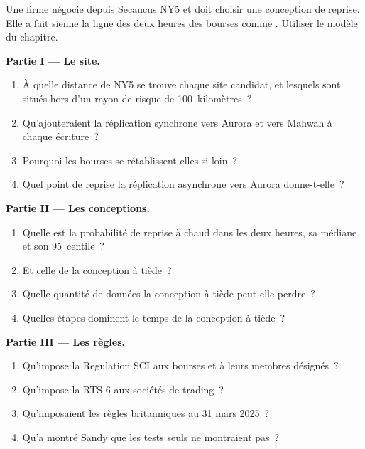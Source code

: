 \begin{problem}\label{pb:nw:disaster-recovery-and-regulatory-requirements:1}
Une firme négocie depuis Secaucus NY5 et doit choisir une conception de reprise. Elle a fait sienne la ligne des deux heures
des bourses comme . Utiliser le modèle du chapitre.

\medskip\noindent\textbf{Partie I --- Le site.}
\begin{enumerate}
\item À quelle distance de NY5 se trouve chaque site candidat, et lesquels sont situés hors d'un rayon de risque de 100~kilomètres~?
\item Qu'ajouteraient la réplication synchrone vers Aurora et vers Mahwah à chaque écriture~?
\item Pourquoi les bourses se rétablissent-elles si loin~?
\item Quel point de reprise la réplication asynchrone vers Aurora donne-t-elle~?
\end{enumerate}

\medskip\noindent\textbf{Partie II --- Les conceptions.}
\begin{enumerate}[resume]
\item Quelle est la probabilité de reprise à chaud dans les deux heures, sa médiane et son 95~centile~?
\item Et celle de la conception à tiède~?
\item Quelle quantité de données la conception à tiède peut-elle perdre~?
\item Quelles étapes dominent le temps de la conception à tiède~?
\end{enumerate}

\medskip\noindent\textbf{Partie III --- Les règles.}
\begin{enumerate}[resume]
\item Qu'impose la Regulation SCI aux bourses et à leurs membres désignés~?
\item Qu'impose la RTS 6 aux sociétés de trading~?
\item Qu'imposaient les règles britanniques au 31 mars 2025~?
\item Qu'a montré Sandy que les tests seuls ne montraient pas~?
\end{enumerate}


\end{problem}

